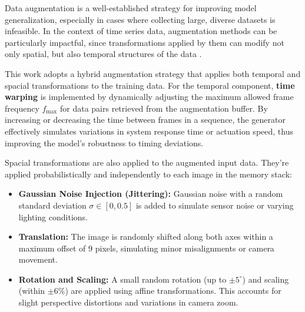 Data augmentation is a well-established strategy for improving model generalization, especially in cases where collecting large, diverse datasets is infeasible. In the context of time series data, augmentation methods can be particularly impactful, since transformations applied by them can modify not only spatial, but also temporal structures of the data \autocite{iglesias2023data}.

This work adopts a hybrid augmentation strategy that applies both temporal and spacial transformations to the training data. For the temporal component, \textbf{time warping} is implemented by dynamically adjusting the maximum allowed frame frequency \( f_{\text{max}} \) for data pairs retrieved from the augmentation buffer. By increasing or decreasing the time between frames in a sequence, the generator effectively simulates variations in system response time or actuation speed, thus improving the model's robustness to timing deviations.

Spacial transformations are also applied to the augmented input data. They're applied probabilistically and independently to each image in the memory stack:

\begin{itemize}
  \item \textbf{Gaussian Noise Injection (Jittering):} Gaussian noise with a random standard deviation \( \sigma \in [0, 0.5] \) is added to simulate sensor noise or varying lighting conditions.
  \item \textbf{Translation:} The image is randomly shifted along both axes within a maximum offset of 9 pixels, simulating minor misalignments or camera movement.
  \item \textbf{Rotation and Scaling:} A small random rotation (up to \( \pm 5^\circ \)) and scaling (within \( \pm 6\% \)) are applied using affine transformations. This accounts for slight perspective distortions and variations in camera zoom.
\end{itemize}

